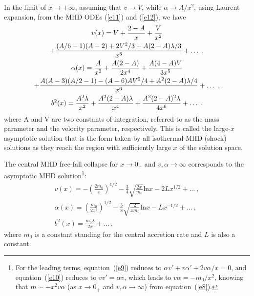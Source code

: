 \documentclass[fleqn,usenatbib]{mnras}
\begin{document}
In the limit of $x\rightarrow +\infty$, assuming that $v\rightarrow V$, while $\alpha\rightarrow A/x^{2}$, using Laurent expansion, from the MHD ODEs (\ref{e11}) and (\ref{e12}), we have
\begin{gather}
v(x)=V+\frac{2-A}{x}+\frac{V}{x^{2}}\notag \\
 + \frac{(A/6-1)(A-2)+2V^{2}/3+A(2-A)\lambda/3}{x^{3}}
 + \ldots\ ,\label{e14}\\
\alpha(x)=\frac{A}{x^{2}}+\frac{A(2-A)}{2x^{4}}
 +\frac{A(4-A)V}{3x^{5}}\notag \\
 +\frac{A(A-3)(A/2-1)-(A-6)AV^{2}/4+A^{2}(2-A)\lambda/4}{x^{6}}
 +\ldots\ ,\label{e15}\\
b^{2}(x)=\frac{A^{2}\lambda}{x^{2}}+\frac{A^{2}(2-A)\lambda}{x^{4}}
 +\frac{A^{2}(2-A)^{2}\lambda}{4x^{6}}+\ldots\ ,
\end{gather}
where A and V are two constants of integration, referred to as the mass parameter and the velocity parameter, respectively. This is called the large-$x$ asymptotic solution that is the form taken by all isothermal MHD (shock) solutions as they reach the region with sufficiently large $x$ of the solution space.


The central MHD free-fall collapse for $x\rightarrow 0_{+}$ and $v,\alpha\rightarrow \infty$ corresponds to the asymptotic MHD solution\footnote{For the leading terms, equation~(\ref{e9}) reduces to $\alpha v'+v\alpha'+2v\alpha/x=0$, and equation~(\ref{e10}) reduces to $vv'=\alpha v$, which leads to $v\alpha=-m_{0}/x^2$, knowing that $m\sim -x^{2}v\alpha$ (as $x\rightarrow 0_{+}$ and $v,\alpha\rightarrow \infty$) from equation~(\ref{e8}).
}:
\begin{gather}
v(x)=-\left(\frac{2m_{0}}{x}\right)^{1/2}
 -\frac{3}{4}\sqrt{\frac{2x}{m_{0}}}\mathrm{ln}x
 -2Lx^{1/2}+\ldots\ ,\label{e16}\\
\alpha(x)=\left(\frac{m_{0}}{2x^{3}}\right)^{1/2}
 -\frac{3}{8}\sqrt{\frac{2}{xm_{0}}}\mathrm{ln}x
 -Lx^{-1/2}+\ldots\ ,\label{e17}\\
b^{2}(x)=\frac{m_{0}\lambda}{2x}+\ldots\ ,
\end{gather}
where $m_{0}$ is a constant standing for the central accretion rate and $L$ is also a constant.
\end{document}
